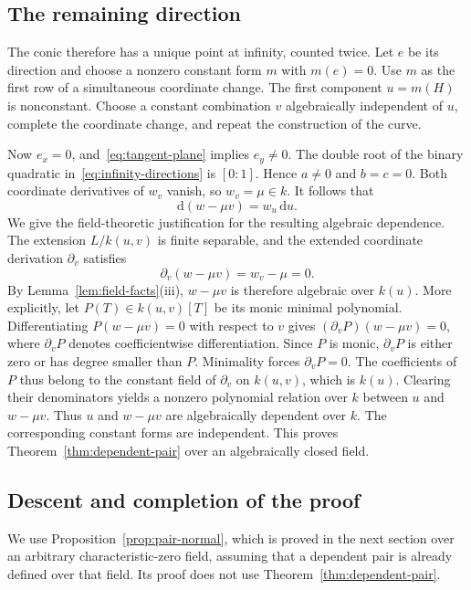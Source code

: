 \documentclass[11pt,reqno]{amsart}
\theoremstyle{definition}
\theoremstyle{remark}
\numberwithin{equation}{section}
\newcommand{\dd}{\mathrm d}
\begin{document}
\subsection{The remaining direction}
The conic therefore has a unique point at infinity, counted twice. Let $e$ be its direction and choose a nonzero constant form $m$ with $m(e)=0$. Use $m$ as the first row of a simultaneous coordinate change. The first component $u=m(H)$ is nonconstant. Choose a constant combination $v$ algebraically independent of $u$, complete the coordinate change, and repeat the construction of the curve.

Now $e_x=0$, and~\eqref{eq:tangent-plane} implies $e_y\neq0$. The double root of the binary quadratic in~\eqref{eq:infinity-directions} is $[0:1]$. Hence $a\neq0$ and $b=c=0$. Both coordinate derivatives of $w_v$ vanish, so $w_v=\mu\in k$. It follows that
\[
 \dd(w-\mu v)=w_u\,\dd u.
\]
We give the field-theoretic justification for the resulting algebraic dependence. The extension $L/k(u,v)$ is finite separable, and the extended coordinate derivation $\partial_v$ satisfies
\[
 \partial_v(w-\mu v)=w_v-\mu=0.
\]
By Lemma~\ref{lem:field-facts}(iii), $w-\mu v$ is therefore algebraic over $k(u)$. More explicitly, let $P(T)\in k(u,v)[T]$ be its monic minimal polynomial. Differentiating $P(w-\mu v)=0$ with respect to $v$ gives $(\partial_vP)(w-\mu v)=0$, where $\partial_vP$ denotes coefficientwise differentiation. Since $P$ is monic, $\partial_vP$ is either zero or has degree smaller than $P$. Minimality forces $\partial_vP=0$. The coefficients of $P$ thus belong to the constant field of $\partial_v$ on $k(u,v)$, which is $k(u)$. Clearing their denominators yields a nonzero polynomial relation over $k$ between $u$ and $w-\mu v$. Thus $u$ and $w-\mu v$ are algebraically dependent over $k$. The corresponding constant forms are independent. This proves Theorem~\ref{thm:dependent-pair} over an algebraically closed field.

\subsection{Descent and completion of the proof}
We use Proposition~\ref{prop:pair-normal}, which is proved in the next section over an arbitrary characteristic-zero field, assuming that a dependent pair is already defined over that field. Its proof does not use Theorem~\ref{thm:dependent-pair}.
\end{document}
